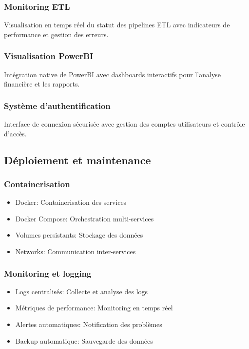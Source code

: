 \documentclass[12pt,a4paper]{article}
\begin{document}
\subsubsection{Monitoring ETL}
Visualisation en temps réel du statut des pipelines ETL avec indicateurs de performance et gestion des erreurs.

\subsubsection{Visualisation PowerBI}
Intégration native de PowerBI avec dashboards interactifs pour l'analyse financière et les rapports.

\subsubsection{Système d'authentification}
Interface de connexion sécurisée avec gestion des comptes utilisateurs et contrôle d'accès.

\subsection{Déploiement et maintenance}
\subsubsection{Containerisation}
\begin{itemize}
    \item Docker: Containerisation des services
    \item Docker Compose: Orchestration multi-services
    \item Volumes persistants: Stockage des données
    \item Networks: Communication inter-services
\end{itemize}

\subsubsection{Monitoring et logging}
\begin{itemize}
    \item Logs centralisés: Collecte et analyse des logs
    \item Métriques de performance: Monitoring en temps réel
    \item Alertes automatiques: Notification des problèmes
    \item Backup automatique: Sauvegarde des données
\end{itemize}
\end{document}
